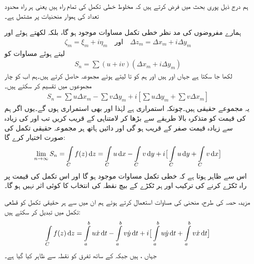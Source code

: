 ہم درج ذیل پوری بحث میں فرض کرتے ہیں کہ مخلوط خطی تکمل کی تمام راہ  ہیں یعنی ہر راہ محدود تعداد کی ہموار منحنیات پر مشتمل ہے۔

ہمارے مفروضوں کی مد نظر  خطی تکمل مساوات  موجود ہو گا، بلکہ  لکھتے ہوئے اور
\begin{align*}
\zeta_m=\xi_m+i\eta_m\quad \text{اور}\quad \Delta z_m=\Delta x_m+i\Delta y_m
\end{align*}
لیتے ہوئے مساوات  کو 
\begin{align}\label{مساوات_مخلوط_تکمل_راہ_ت}
S_n=\sum(u+iv)(\Delta x_m+i\Delta y_m)
\end{align}
لکھا جا سکتا ہے جہاں  اور  ہیں اور ہم  کو  تا  لیتے ہوئے مجموعہ حاصل کرتے ہیں۔ہم اب  کو چار مجموعوں میں تقسیم کر سکتے ہیں۔
\begin{align*}
S_n=\sum u\Delta x_m-\sum v\Delta y_m+i[\sum u\Delta y_m+\sum v\Delta x_m]
\end{align*}
یہ مجموعے حقیقی ہیں۔چونکہ  استمراری ہے لہٰذا  اور  بھی استمراری ہوں گے۔یوں اگر ہم  کی قیمت کو متذکرہ بالا طریقے سے بڑھا کر لامتناہی کے قریب کریں تب  اور  کی زیادہ سے زیادہ قیمت صفر کے قریب ہو  گی اور دائیں ہاتھ ہر مجموعہ حقیقی تکمل کی صورت اختیار کرے گا:
\begin{align}\label{مساوات_مخلوط_تکمل_راہ_ٹ}
\lim_{n\to \infty} S_n =\int\limits_C f(z)\dif z=\int\limits_C u\dif x-\int\limits_C  v\dif y+i\big[\int\limits_C u\dif y+\int\limits_C v\dif x\big]
\end{align} 
اس سے ظاہر ہوتا ہے کہ خطی تکمل مساوات  موجود ہو گا اور اس تکمل کی قیمت پر راہ ٹکڑے کرنے کی ترکیب اور ہر ٹکڑے کے بیچ نقطہ  کی انتخاب کا کوئی اثر نہیں ہو گا۔

مزید، حصہ  کی طرح، منحنی  کی مساوات  استعمال کرتے ہوئے ہم ان میں سے ہر حقیقی تکمل کو قطعی تکمل میں تبدیل کر سکتے ہیں:
\begin{align}\label{مساوات_مخلوط_تکمل_راہ_ث}
\int\limits_C f(z)\dif z=\int\limits_a^b u \dot{x}\dif t-\int\limits_a^b v\dot{y}\dif t+i\big[\int\limits_a^b u \dot{y} \dif t+\int\limits_a^b v\dot{x}\dif t\big]
\end{align}
جہاں ،  ہیں جبکہ  کے ساتھ تفرق کو نقطہ سے ظاہر کیا گیا ہے۔

